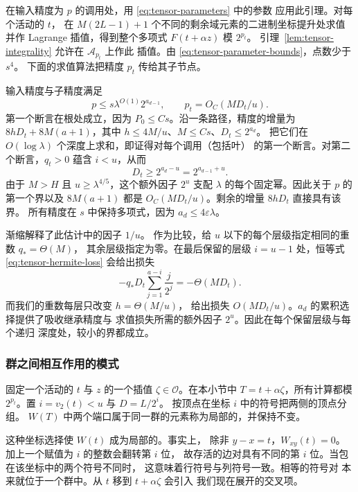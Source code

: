 在输入精度为 $p$ 的调用处，用 \eqref{eq:tensor-parameters} 中的参数
应用此引理。对每个活动的 $t$，
在 $M(2L-1)+1$ 个不同的剩余域元素的二进制坐标提升处求值并作 Lagrange
插值，得到整个多项式 $F(t+\alpha z)$ 模 $2^{p_t}$。
引理~\ref{lem:tensor-integrality} 允许在 $\mathcal A_{p_t}$ 上作此
插值。由 \eqref{eq:tensor-parameter-bounds}，点数少于 $s^4$。
下面的求值算法把精度 $p_t$ 传给其子节点。

输入精度与子精度满足
\begin{equation}\label{eq:tensor-precision-bound}
 p\le s\lambda^{O(1)}2^{a_{d-1}},
 \qquad
 p_t=O_C(MD_t/u).
\end{equation}
第一个断言在根处成立，因为 $P_0\le Cs$。沿一条路径，精度的增量为
$8hD_t+8M(a+1)$，其中 $h\le4M/u$、$M\le Cs$、$D_t\le2^{a_d}$。
把它们在 $O(\log\lambda)$ 个深度上求和，即证得对每个调用（包括叶）
的第一个断言。对第二个断言，$q_t>0$ 蕴含 $i<u$，从而
\[
 D_t\ge2^{a_d-u}=2^{a_{d-1}+u}.
\]
由于 $M>H$ 且 $u\ge\lambda^{4/5}$，这个额外因子 $2^u$ 支配 $\lambda$
的每个固定幂。因此关于 $p$ 的第一个界以及 $8M(a+1)$ 都是
$O_C(MD_t/u)$。剩余的增量 $8hD_t$ 直接具有该界。
所有精度在 $s$ 中保持多项式，因为
$a_d\le4\varepsilon\lambda$。

渐缩解释了此估计中的因子 $1/u$。
作为比较，给 $u$ 以下的每个层级指定相同的重数 $q_*=\Theta(M)$，
其余层级指定为零。在最后保留的层级 $i=u-1$ 处，恒等式
\eqref{eq:tensor-hermite-loss} 会给出损失
\[
 -q_*D_t\sum_{j=1}^{a-i}\frac{j}{2^j}=-\Theta(MD_t).
\]
而我们的重数每层只改变 $h=\Theta(M/u)$，
给出损失 $O(MD_t/u)$。$a_d$ 的累积选择提供了吸收继承精度与
求值损失所需的额外因子 $2^u$。因此在每个保留层级与每个递归
深度处，较小的界都成立。

\subsubsection{群之间相互作用的模式}
\label{subsec:tensor-modes}

固定一个活动的 $t$ 与 $z$ 的一个插值 $\zeta\in\mathcal O$。在本小节中
$T=t+\alpha\zeta$，所有计算都模 $2^{p_t}$。置 $i=v_2(t)<u$ 与
$D=L/2^i$。
按顶点在坐标 $i$ 中的符号把两侧的顶点分组。
$W(T)$ 中两个端口属于同一群的元素称为局部的，并保持不变。

这种坐标选择使 $W(t)$ 成为局部的。事实上，
除非 $y-x=t$，$W_{xy}(t)=0$。加上一个赋值为 $i$ 的整数会翻转第 $i$ 位，
故存活的边对具有不同的第 $i$ 位。当包在该坐标中的两个符号不同时，
这意味着行符号与列符号一致。相等的符号对
本来就位于一个群中。从 $t$ 移到 $t+\alpha\zeta$ 会引入
我们现在展开的交叉项。

